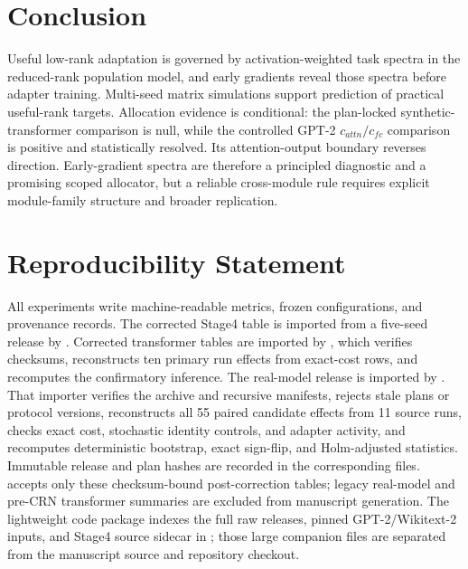 \documentclass[10pt,twocolumn]{article}
\theoremstyle{definition}
\begin{document}
\section{Conclusion}
\label{sec:conclusion}

Useful low-rank adaptation is governed by activation-weighted task spectra in the reduced-rank population model, and early gradients reveal those spectra before adapter training.  Multi-seed matrix simulations support prediction of practical useful-rank targets.  Allocation evidence is conditional: the plan-locked synthetic-transformer comparison is null, while the controlled GPT-2 $c_{attn}/c_{fc}$ comparison is positive and statistically resolved.  Its attention-output boundary reverses direction.  Early-gradient spectra are therefore a principled diagnostic and a promising scoped allocator, but a reliable cross-module rule requires explicit module-family structure and broader replication.

\section*{Reproducibility Statement}
All experiments write machine-readable metrics, frozen configurations, and provenance records.  The corrected Stage4 table is imported from a five-seed release by .  Corrected transformer tables are imported by , which verifies checksums, reconstructs ten primary run effects from exact-cost rows, and recomputes the confirmatory inference.  The real-model release  is imported by .  That importer verifies the archive and recursive manifests, rejects stale plans or protocol versions, reconstructs all 55 paired candidate effects from 11 source runs, checks exact cost, stochastic identity controls, and adapter activity, and recomputes deterministic bootstrap, exact sign-flip, and Holm-adjusted statistics.  Immutable release and plan hashes are recorded in the corresponding  files.   accepts only these checksum-bound post-correction tables; legacy real-model and pre-CRN transformer summaries are excluded from manuscript generation.  The lightweight code package indexes the full raw releases, pinned GPT-2/Wikitext-2 inputs, and Stage4 source sidecar in ; those large companion files are separated from the manuscript source and repository checkout.
\end{document}
